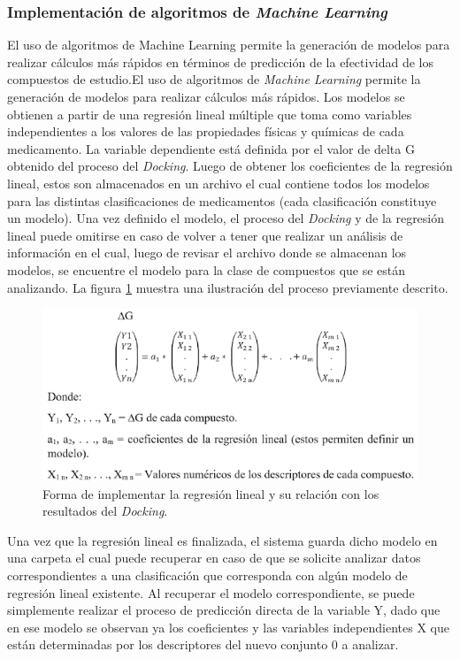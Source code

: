 \subsubsection{Implementación de algoritmos de \textit{Machine Learning}}{
\noindent El uso de algoritmos de Machine Learning permite la generación de modelos para realizar cálculos más rápidos en términos de predicción de la efectividad de los compuestos de estudio.El uso de algoritmos de \textit{Machine Learning} permite la generación de modelos para realizar cálculos más rápidos. Los modelos se obtienen a partir de una regresión lineal múltiple que toma como variables independientes a los valores de las propiedades físicas y químicas de cada medicamento. La variable dependiente está definida por el valor de delta G obtenido del proceso del \textit{Docking}. Luego de obtener los coeficientes de la regresión lineal, estos son almacenados en un archivo el cual contiene todos los modelos para las distintas clasificaciones de medicamentos (cada clasificación constituye un modelo). Una vez definido el modelo, el proceso del \textit{Docking} y de la regresión lineal puede omitirse en caso de volver a tener que realizar un análisis de información en el cual, luego de revisar el archivo donde se almacenan los modelos, se encuentre el modelo para la clase de compuestos que se están analizando. La figura \ref{Machine} muestra una ilustración del proceso previamente descrito.

\begin{figure}[H]
    \centering
    \includegraphics[scale=0.70]{Capitulo4/Documentos/imagenes_entorno/regresion_lineal.png}
    \caption{Forma de implementar la regresión lineal y su relación con los resultados del \textit{Docking}.}
    \label{Machine}
\end{figure}
\noindent Una vez que la regresión lineal es finalizada, el sistema guarda dicho modelo en una carpeta el cual puede recuperar en caso de que se solicite analizar datos correspondientes a una clasificación que corresponda con algún modelo de regresión lineal existente. Al recuperar el modelo correspondiente, se puede simplemente realizar el proceso de predicción directa de la variable Y, dado que en ese modelo se observan ya los coeficientes y las variables independientes X que están determinadas por los descriptores del nuevo conjunto 0 a analizar.
}
